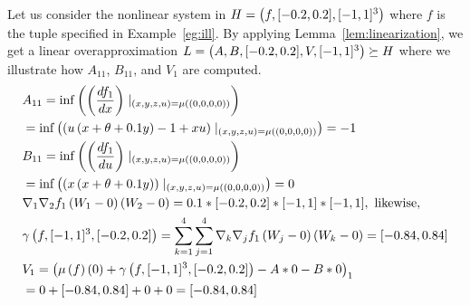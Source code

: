 %
\begin{example}
Let us consider the nonlinear system in $H
= \left(f,[-0.2,0.2],[-1,1]^3\right)$ where $f$ is the tuple specified in
Example~\ref{eg:ill}.  By applying Lemma~\ref{lem:linearization}, we
get a linear overapproximation $L
= \left(A,B,[-0.2,0.2],V,[-1,1]^3\right)\succeq H$
where we illustrate how $A_{11}$, $B_{11}$, and $V_{1}$ are computed.
%
\begin{align*}
& A_{11} = \inf\rb{\rb{\frac{df_1}{dx}}\mid_{\rb{x,y,z,u} =
\ivmat{(0,0,0,0)}}} \\ & = \inf\rb{\rb{u\rb{ x + \theta + 0.1y } - 1 +
xu}\mid_{\rb{x,y,z,u} = \ivmat{(0,0,0,0)}}} = -1 \\
%
& B_{11} = \inf\rb{\rb{\frac{df_1}{du}}\mid_{\rb{x,y,z,u} =
\ivmat{(0,0,0,0)}}} \\ &= \inf\rb{\rb{x\rb{ x + \theta + 0.1y
}}\mid_{\rb{x,y,z,u} = \ivmat{(0,0,0,0)}}} = 0 \\
%
& \nabla_1\nabla_2f_1\rb{W_1-0}\rb{W_2-0} =
0.1*[-0.2,0.2]*[-1,1]*[-1,1],~\text{likewise},\\
& \taylor{f}{[-1,1]^3}{[-0.2,0.2]}
= \sum_{k=1}^4\sum_{j=1}^4\nabla_k\nabla_jf_1\rb{W_j-0}\rb{W_k-0}
= [-0.84, 0.84]\\
%
& V_1 = \rb{\iv{f}{ 0 }
+ \taylor{f}{[-1,1]^3}{[-0.2,0.2]}
- A*0 - B*0}_1 \\
& = 0 + [-0.84,0.84] + 0 + 0 = [-0.84, 0.84]
\end{align*}
%
\end{example}
%
